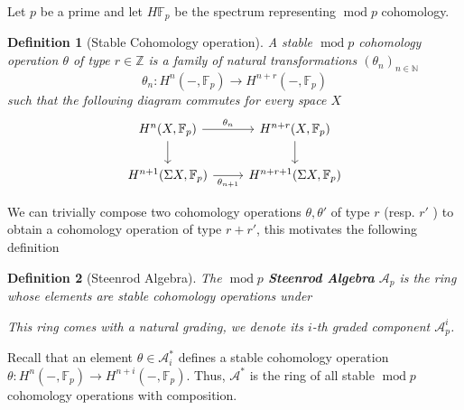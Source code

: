 \documentclass[11pt, a4paper]{article}
\DeclareMathOperator*{\cmod}{mod}
\newtheorem{defn}{Definition}
\theoremstyle{plain}
\begin{document}
Let $p$ be a prime and let $H\mathbb{F}_p$ be the spectrum representing $\cmod p$ cohomology.
\begin{defn}[Stable Cohomology operation]
A stable $\cmod p$ cohomology operation $\theta$ of type $r\in \mathbb{Z}$ is a family of natural transformations $( \theta_n)_{n \in \mathbb{N}} $
\[ 
\theta_n\colon H^{n}( -, \mathbb{F}_p) \to H^{n+r}( -, \mathbb{F}_p) 
\]
such that the following diagram commutes for every space $X$ 
\[\begin{tikzcd}
	{H^n(X,\mathbb{F}_p)} & {H^{n+r}(X,\mathbb{F}_p)} \\
	{H^{n+1}(\Sigma X,\mathbb{F}_p)} & {H^{n+r+1}(\Sigma X,\mathbb{F}_p)}
	\arrow["{\theta_n}", from=1-1, to=1-2]
	\arrow[from=1-1, to=2-1]
	\arrow[from=1-2, to=2-2]
	\arrow["{\theta_{n+1}}"', from=2-1, to=2-2]
\end{tikzcd}\]
\end{defn}
We can trivially compose two cohomology operations $\theta, \theta'$ of type $r$ (resp. $r'$ ) to obtain a cohomology operation of type $r+r'$, this motivates the following definition

\begin{defn}[Steenrod Algebra]
	The $\cmod p$ \textbf{Steenrod Algebra} $\mathcal{A}_p$  is the ring whose elements are stable cohomology operations under

	This ring comes with a natural grading, we denote its $i$-th graded component $\mathcal{A}_p^{i}$.
\end{defn}
Recall that an element $\theta \in \mathcal{A}_i^\ast$ defines a stable cohomology operation $\theta\colon H^{n}( -, \mathbb{F}_p) \to H^{n+i}( -, \mathbb{F}_p) $. Thus, $\mathcal{A}^{\ast}$ is the ring of all stable $\cmod p$ cohomology operations with composition.
\end{document}
